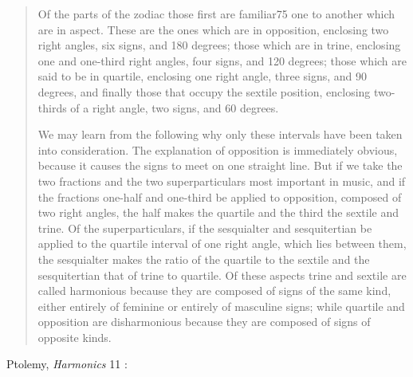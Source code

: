 \documentclass{amsart}
\theoremstyle{definition}
\begin{document}
\begin{quote}
Of the parts of the zodiac those first are familiar75 one to another which are in aspect. These are the ones which are in opposition, enclosing two right angles, six signs, and 180 degrees; those which are in trine, enclosing one and one-third right angles, four signs, and 120 degrees; those which are said to be in quartile, enclosing one right angle, three signs, and 90 degrees, and finally those that occupy the sextile position, enclosing two-thirds of a right angle, two signs, and 60 degrees.

We may learn from the following why only these intervals have been taken into consideration. The explanation of opposition is immediately obvious, because it causes the signs to meet on one straight line. But if we take the two fractions and the two superparticulars most important in music, and if the fractions one-half and one-third be applied to opposition, composed of two right angles, the half makes the quartile and the third the sextile and trine. Of the superparticulars, if the sesquialter and sesquitertian be applied to the quartile interval of one right angle, which lies between them, the sesquialter makes the ratio of the quartile to the sextile and the sesquitertian that of trine to quartile. Of these aspects trine and sextile are called
harmonious because they are composed of signs of the same kind, either entirely of feminine or entirely of masculine signs; while quartile and opposition are disharmonious because they are composed of signs of opposite kinds.
\end{quote}

Ptolemy, {\em Harmonics} 11 \cite[pp.~284--285]{barker}:
\end{document}
